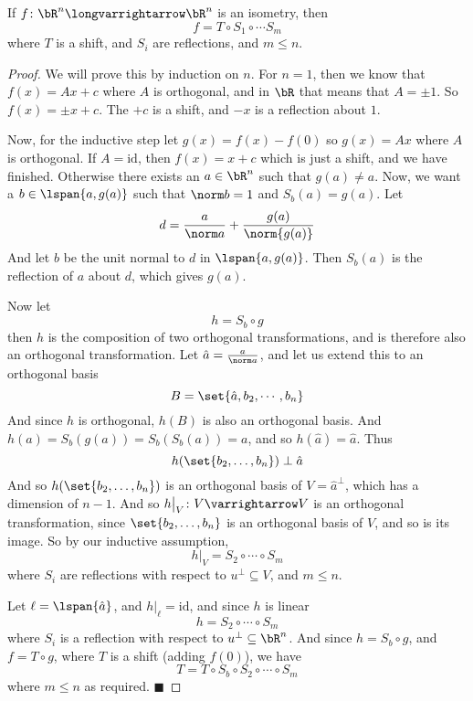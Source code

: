 \documentclass[10pt]{article}
\let\to=\varrightarrow
\let\longto=\longvarrightarrow
\def\qed{%
    \ifmmode%
        \eqno\blacksquare%
    \else%
        \hskip1cm\allowbreak\hbox{}\nobreak\hfill$\blacksquare$%
    \fi%
}
\begin{document}
\begin{thrm*}

    If $f\colon\bR^n\longto\bR^n$ is an isometry, then
    \[ f = T\circ S_1\circ\cdots S_m \]
    where $T$ is a shift, and $S_i$ are reflections, and $m\leq n$.

\end{thrm*}

\begin{proof}

    We will prove this by induction on $n$.
    For $n=1$, then we know that $f(x)=Ax+c$ where $A$ is orthogonal, and in $\bR$ that means that $A=\pm1$.
    So $f(x)=\pm x+c$.
    The $+c$ is a shift, and $-x$ is a reflection about $1$.

    Now, for the inductive step let $g(x)=f(x)-f(0)$ so $g(x)=Ax$ where $A$ is orthogonal.
    If $A=\mathrm{id}$, then $f(x)=x+c$ which is just a shift, and we have finished.
    Otherwise there exists an $a\in\bR^n$ such that $g(a)\neq a$.
    Now, we want a $b\in\lspan{a,g(a)}$ such that $\norm b=1$ and $S_b(a)=g(a)$.
    Let
    \[ d = \frac a{\norm a}+\frac{g(a)}{\norm{g(a)}} \]
    And let $b$ be the unit normal to $d$ in $\lspan{a,g(a)}$.
    Then $S_b(a)$ is the reflection of $a$ about $d$, which gives $g(a)$.

    Now let
    \[ h = S_b\circ g \]
    then $h$ is the composition of two orthogonal transformations, and is therefore also an orthogonal transformation.
    Let $\hat a=\frac a{\norm a}$, and let us extend this to an orthogonal basis
    \[ B = \set{\hat a,b_2,\cdots,b_n} \]
    And since $h$ is orthogonal, $h(B)$ is also an orthogonal basis.
    And $h(a)=S_b(g(a))=S_b(S_b(a))=a$, and so $h(\hat a)=\hat a$.
    Thus
    \[ h(\set{b_2,\dots,b_n})\perp\hat a \]
    And so $h(\set{b_2,\dots,b_n})$ is an orthogonal basis of $V=\hat a^\perp$, which has a dimension of $n-1$.
    And so $h\bigl\vert_V\colon V\to V$ is an orthogonal transformation, since $\set{b_2,\dots,b_n}$ is an orthogonal basis of $V$, and so is its image.
    So by our inductive assumption,
    \[ h\bigl\vert_V = S_2\circ\cdots\circ S_m \]
    where $S_i$ are reflections with respect to $u^\perp\subseteq V$, and $m\leq n$.

    Let $\ell=\lspan{\hat a}$, and $h\bigl\vert_\ell=\mathrm{id}$, and since $h$ is linear
    \[ h = S_2\circ\cdots\circ S_m \]
    where $S_i$ is a reflection with respect to $u^\perp\subseteq\bR^n$.
    And since $h=S_b\circ g$, and $f=T\circ g$, where $T$ is a shift (adding $f(0)$), we have
    \[ T = T\circ S_b\circ S_2\circ\cdots\circ S_m \]
    where $m\leq n$ as required.
    \qed

\end{proof}
\end{document}
